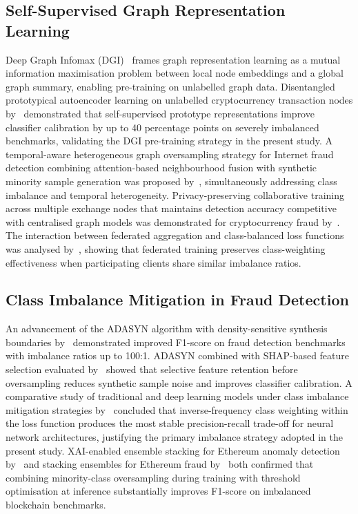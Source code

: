 \documentclass[12pt,a4paper]{article}
\begin{document}
\subsection{Self-Supervised Graph Representation Learning}

Deep Graph Infomax (DGI)~\citep{velickovic2019dgi} frames
graph representation learning as a mutual information
maximisation problem between local node embeddings and a
global graph summary, enabling pre-training on unlabelled
graph data. Disentangled prototypical autoencoder learning
on unlabelled cryptocurrency transaction nodes
by~\citet{graphanomaly2024} demonstrated that self-supervised
prototype representations improve classifier calibration by
up to 40 percentage points on severely imbalanced benchmarks,
validating the DGI pre-training strategy in the present study.
A temporal-aware heterogeneous graph oversampling strategy
for Internet fraud detection combining attention-based
neighbourhood fusion with synthetic minority sample generation
was proposed by~\citet{wei2025}, simultaneously addressing
class imbalance and temporal heterogeneity. Privacy-preserving
collaborative training across multiple exchange nodes that
maintains detection accuracy competitive with centralised
graph models was demonstrated for cryptocurrency fraud
by~\citet{ahmed2024fed}. The interaction between federated
aggregation and class-balanced loss functions was analysed
by~\citet{baabdullah2024}, showing that federated training
preserves class-weighting effectiveness when participating
clients share similar imbalance ratios.

\subsection{Class Imbalance Mitigation in Fraud Detection}

An advancement of the ADASYN algorithm with density-sensitive
synthesis boundaries by~\citet{tekkali2024} demonstrated
improved F1-score on fraud detection benchmarks with imbalance
ratios up to 100:1. ADASYN combined with SHAP-based feature
selection evaluated by~\citet{creditadasyn2024} showed that
selective feature retention before oversampling reduces
synthetic sample noise and improves classifier calibration.
A comparative study of traditional and deep learning models
under class imbalance mitigation strategies by~\citet{albalawi2025}
concluded that inverse-frequency class weighting within the
loss function produces the most stable precision-recall
trade-off for neural network architectures, justifying the
primary imbalance strategy adopted in the present study.
XAI-enabled ensemble stacking for Ethereum anomaly
detection by~\citet{chithanuru2025} and stacking ensembles
for Ethereum fraud by~\citet{gu2025} both confirmed that
combining minority-class oversampling during training with
threshold optimisation at inference substantially improves
F1-score on imbalanced blockchain benchmarks.
\end{document}
